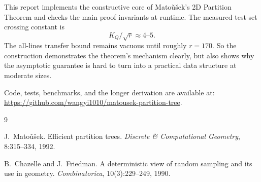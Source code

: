 \documentclass[11pt,a4paper]{article}
\begin{document}
This report implements the constructive core of Mato\v{u}\v{s}ek's 2D
Partition Theorem and checks the main proof invariants at runtime. The
measured test-set crossing constant is
\[
  K_Q/\sqrt r\approx 4\text{--}5.
\]
The all-lines transfer bound remains vacuous until roughly $r=170$.
So the construction demonstrates the theorem's mechanism clearly, but
also shows why the asymptotic guarantee is hard to turn into a
practical data structure at moderate sizes.

Code, tests, benchmarks, and the longer derivation are available at:
\url{https://github.com/wangyi1010/matousek-partition-tree}.


\begin{thebibliography}{9}

J.~Mato\v{u}\v{s}ek.
\newblock Efficient partition trees.
\newblock \emph{Discrete \& Computational Geometry}, 8:315--334, 1992.

B.~Chazelle and J.~Friedman.
\newblock A deterministic view of random sampling and its use in geometry.
\newblock \emph{Combinatorica}, 10(3):229--249, 1990.

\end{thebibliography}
\end{document}
